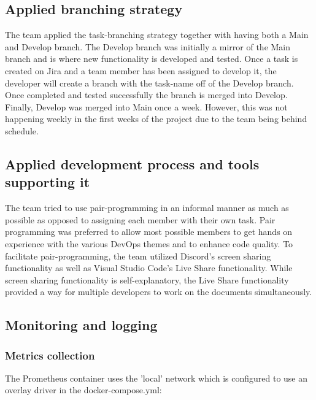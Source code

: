 \subsection{Applied branching strategy}
The team applied the task-branching strategy\cite{branching} together with having both a Main and Develop branch. The Develop branch was initially a mirror of the Main branch and is where new functionality is developed and tested. Once a task is created on Jira and a team member has been assigned to develop it, the developer will create a branch with the task-name off of the Develop branch. Once completed and tested successfully the branch is merged into Develop. Finally, Develop was merged into Main once a week. However, this was not happening weekly in the first weeks of the project due to the team being behind schedule. 

\subsection{Applied development process and tools supporting it}
The team tried to use pair-programming in an informal manner as much as possible as opposed to assigning each member with their own task. Pair programming was preferred to allow most possible members to get hands on experience with the various DevOps themes and to enhance code quality. To facilitate pair-programming, the team utilized Discord's screen sharing functionality as well as Visual Studio Code's Live Share functionality\cite{live_share}. While screen sharing functionality is self-explanatory, the Live Share functionality provided a way for multiple developers to work on the documents simultaneously. 

\subsection{Monitoring and logging}

\subsubsection{Metrics collection}
The Prometheus container uses the 'local' network which is configured to use an overlay driver in the docker-compose.yml:

